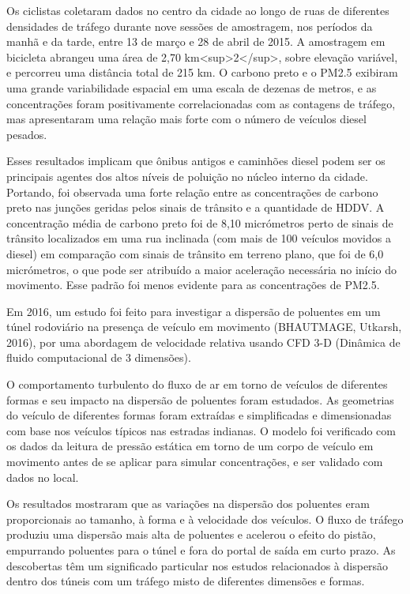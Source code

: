 Os ciclistas coletaram dados no centro da cidade ao longo de ruas de diferentes densidades de 
tráfego durante nove sessões de amostragem, nos períodos da manhã e da tarde, entre 13 de março e 28 
de abril de 2015. A amostragem em bicicleta abrangeu uma área de 2,70 km<sup>2</sup>, sobre elevação 
variável, e percorreu uma distância total de 215 km. O carbono preto e o PM2.5 exibiram uma grande 
variabilidade espacial em uma escala de dezenas de metros, e as concentrações foram positivamente 
correlacionadas com as contagens de tráfego, mas apresentaram uma relação mais forte com o número de 
veículos diesel pesados. 

Esses resultados implicam que ônibus antigos e caminhões diesel podem ser os principais agentes dos 
altos níveis de poluição no núcleo interno da cidade. Portando, foi observada uma forte relação 
entre as concentrações de carbono preto nas junções geridas pelos sinais de trânsito e a quantidade 
de HDDV. A concentração média de carbono preto foi de 8,10 micrómetros perto de sinais de trânsito 
localizados em uma rua inclinada (com mais de 100 veículos movidos a diesel) em comparação com sinais 
de trânsito em terreno plano, que foi de 6,0 micrómetros, o que pode ser atribuído a maior aceleração 
necessária no início do movimento. Esse padrão foi menos evidente para as concentrações de PM2.5.

Em 2016, um estudo foi feito para investigar a dispersão de poluentes em um túnel rodoviário na 
presença de veículo em movimento (BHAUTMAGE, Utkarsh, 2016), por uma abordagem de velocidade relativa 
usando CFD 3-D (Dinâmica de fluido computacional de 3 dimensões). 

O comportamento turbulento do fluxo de ar em torno de veículos de diferentes formas e seu impacto na 
dispersão de poluentes foram estudados. As geometrias do veículo de diferentes formas foram extraídas 
e simplificadas e dimensionadas com base nos veículos típicos nas estradas indianas. O modelo foi 
verificado com os dados da leitura de pressão estática em torno de um corpo de veículo em movimento 
antes de se aplicar para simular concentrações, e ser validado com dados no local.

Os resultados mostraram que as variações na dispersão dos poluentes eram proporcionais ao tamanho, à 
forma e à velocidade dos veículos. O fluxo de tráfego produziu uma dispersão mais alta de poluentes 
e acelerou o efeito do pistão, empurrando poluentes para o túnel e fora do portal de saída em curto 
prazo. As descobertas têm um significado particular nos estudos relacionados à dispersão dentro dos 
túneis com um tráfego misto de diferentes dimensões e formas.


